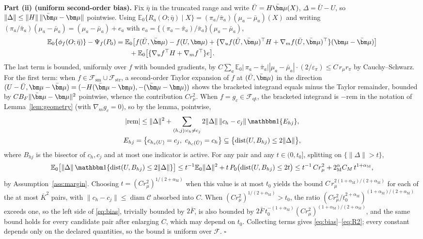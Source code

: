 \documentclass[11pt]{article}
\newcommand{\E}{\mathbb E}
\newcommand{\ind}[1]{\mathbbm 1\{#1\}}
\newcommand{\dist}{\operatorname{dist}}
\newcommand{\diam}{\operatorname{diam}}
\newcommand{\calC}{\mathcal C}
\newcommand{\calF}{\mathcal F}
\newcommand{\bmu}{\bm\mu}
\newcommand{\eps}{\varepsilon}
\newcommand{\norm}[1]{\lVert #1\rVert}
\newcommand{\am}{\alpha_{\mathrm M}}
\begin{document}
\textbf{Part (ii) (uniform second-order bias).}
Fix $\bar\eta$ in the truncated range and write $\bar U=H\bar\bmu(X)$, $\Delta=\bar U-U$, so $\norm{\Delta}\le\norm{H}\,\norm{\bar\bmu-\bmu}$ pointwise. Using $\E_0\{R_a(O;\bar\eta)\mid X\}=(\pi_a/\bar\pi_a)(\mu_a-\bar\mu_a)(X)$ and writing $(\pi_a/\bar\pi_a)(\mu_a-\bar\mu_a)=(\mu_a-\bar\mu_a)+e_a$ with $e_a=\{(\pi_a-\bar\pi_a)/\bar\pi_a\}(\mu_a-\bar\mu_a)$,
\begin{equation}\label{eq:biasdecomp}
\begin{split}
\E_0\{\phi_f(O;\bar\eta)\}-\Psi_f(P_0)
&=\E_0\bigl[f(\bar U,\bar\bmu)-f(U,\bmu)+\{\nabla_uf(\bar U,\bar\bmu)^\top H+\nabla_mf(\bar U,\bar\bmu)^\top\}(\bmu-\bar\bmu)\bigr]\\
&\qquad+\E_0\bigl[\{\nabla_uf^\top H+\nabla_mf^\top\}e\bigr].
\end{split}
\end{equation}
The last term is bounded, uniformly over $f$ with bounded gradients, by $C\sum_a\E_0|\,\pi_a-\bar\pi_a||\mu_a-\bar\mu_a|\cdot(2/\eps_\pi)\le C\,r_\mu r_\pi$ by Cauchy--Schwarz. For the first term: when $f\in\calF_{\mathrm{sm}}\cup\calF_{\mathrm{str}}$, a second-order Taylor expansion of $f$ at $(\bar U,\bar\bmu)$ in the direction $(U-\bar U,\bmu-\bar\bmu)=(-H(\bar\bmu-\bmu),-(\bar\bmu-\bmu))$ shows the bracketed integrand equals minus the Taylor remainder, bounded by $CB_F\norm{\bar\bmu-\bmu}^2$ pointwise, whence the contribution $Cr_\mu^2$. When $f=g_c\in\calF_{\mathrm{qt}}$, the bracketed integrand is $-\mathrm{rem}$ in the notation of Lemma~\ref{lem:geometry} (with $\nabla_mg_c=0$), so by the lemma, pointwise,
\begin{gather*}
|\mathrm{rem}|\le\norm{\Delta}^2+\sum_{(h,j):c_h\ne c_j}2\norm{\Delta}\,\norm{c_h-c_j}\,\ind{E_{hj}},\\
E_{hj}=\bigl\{c_{h_c(U)}=c_j,\ c_{h_c(\bar U)}=c_h\bigr\}\subseteq\bigl\{\dist(U,B_{hj})\le2\norm{\Delta}\bigr\},
\end{gather*}
where $B_{hj}$ is the bisector of $c_h,c_j$ and at most one indicator is active. For any pair and any $t\in(0,t_0]$, splitting on $\{\norm{\Delta}>t\}$,
\begin{equation*}
\E_0\bigl[\norm{\Delta}\,\ind{\dist(U,B_{hj})\le2\norm{\Delta}}\bigr]
\le t^{-1}\E_0\norm{\Delta}^2+t\,P_0\bigl(\dist(U,B_{hj})\le2t\bigr)
\le t^{-1}\,C r_\mu^2+2^\am  C_M\,t^{1+\am},
\end{equation*}
by Assumption~\ref{ass:margin}. Choosing $t=(Cr_\mu^2)^{1/(2+\am)}$ when this value is at most $t_0$ yields the bound $C\,r_\mu^{2(1+\am)/(2+\am)}$ for each of the at most $\overline K^2$ pairs, with $\norm{c_h-c_j}\le\diam\calC$ absorbed into $C$. When $(Cr_\mu^2)^{1/(2+\am)}>t_0$, the ratio $(Cr_\mu^2/t_0^{2+\am})^{(1+\am)/(2+\am)}$ exceeds one, so the left side of \eqref{eq:bias}, trivially bounded by $2\bar F$, is also bounded by $2\bar F\,t_0^{-(1+\am)}(Cr_\mu^2)^{(1+\am)/(2+\am)}$, and the same bound holds for every candidate pair after enlarging $C$, which may depend on $t_0$. Collecting terms gives \eqref{eq:bias}--\eqref{eq:R2}; every constant depends only on the declared quantities, so the bound is uniform over $\calF$. \hfill$\square$
\end{document}
